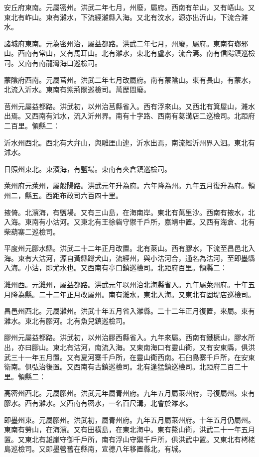 安丘府東南。元屬密州。洪武二年七月，州廢，屬府。西南有牟山，又有峿山。又東北有岞山。東有濰水，下流經濰縣入海。又北有汶水，源亦出沂山，下流合濰水。

諸城府東南。元為密州治，屬益都路。洪武二年七月，州廢，屬府。東南有瑯邪山。西南有常山，又有馬耳山。北有濰水，東北有盧水，流合焉。南有信陽鎮巡檢司。又南有南龍灣海口巡檢司。

蒙陰府西南。元屬莒州。洪武二年七月改屬府。南有蒙陰山。東有長山，有蒙水，北流入沂水。東南有紫荊關巡檢司。萬歷間廢。

莒州元屬益都路。洪武初，以州治莒縣省入。西有浮來山。又西北有箕屋山，濰水出焉。又西南有沭水，流入沂州界。南有十字路、西南有葛溝店二巡檢司。北距府二百里。領縣二：

沂水州西北。西北有大弁山，與雕厓山連，沂水出焉，南流經沂州界入泗。東北有沭水。

日照州東北。東濱海，有鹽場。東南有夾倉鎮巡檢司。

萊州府元萊州，屬般陽路。洪武元年升為府。六年降為州。九年五月復升為府。領州二，縣五。西距布政司六百四十里。

掖倚。北濱海，有鹽場。又有三山島，在海南岸。東北有萬里沙。西南有掖水，北入海。東南有小沽河。又東北有王徐砦守禦千戶所，嘉靖中置。又西有海倉、北有柴葫寨二巡檢司。

平度州元膠水縣。洪武二十二年正月改置。北有萊山。西有膠水，下流至昌邑北入海。東有大沽河，源自黃縣蹲犬山，流經州，與小沽河合，通名為沽河，至即墨縣入海。小沽，即尤水也。又西南有亭口鎮巡檢司。北距府百里。領縣二：

濰州西。元濰州，屬益都路。洪武元年以州治北海縣省入。九年屬萊州府。十年五月降為縣。二十二年正月改屬州。南有濰水，東北入海。又東北有固堤店巡檢司。

昌邑州西北。元屬濰州。洪武十年五月省入濰縣。二十二年正月復置，來屬。東有濰水。東北有膠河。北有魚兒鎮巡檢司。

膠州元屬益都路。洪武初，以州治膠西縣省入。九年來屬。西南有鐵橛山，膠水所出，亦曰膠山。東北有沽河，南流入海。又東南海口有靈山衛，又有安東縣，俱洪武三十一年五月置。又有夏河寨千戶所，在靈山衛西南。石臼島寨千戶所，在安東衛南。俱弘治後置。又西南有古鎮巡檢司。北有逢猛鎮巡檢司。北距府二百二十里。領縣二：

高密州西北。元屬膠州。洪武元年屬青州府。九年五月屬萊州府，尋復屬州。東有膠水。西有濰水。又西南有密水，一名百尺溝，北會於濰水。

即墨州東。元屬膠州。洪武初，屬青州府。九年五月屬萊州府。十年五月仍屬州。東南有勞山，在海濱。又有田橫島，在東北海中。東有鰲山衛，洪武二十一年五月置。又東北有雄崖守御千戶所，南有浮山守禦千戶所，俱洪武中置。又東北有栲栳島巡檢司。又即墨營舊在縣南，宣德八年移置縣北，有城。

